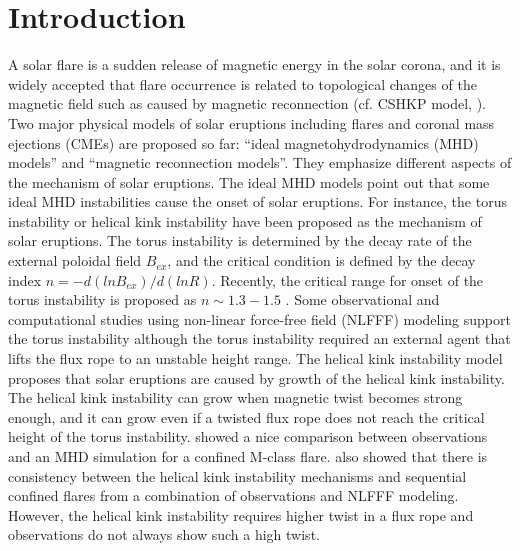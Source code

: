 \documentclass[10pt,preprint2]{aastex}
\begin{document}
\section{Introduction} \label{sec:intro}

A solar flare is a sudden release of magnetic energy in the solar corona, and it is widely accepted that flare occurrence is related to topological changes of the magnetic field such as caused by magnetic reconnection (cf. CSHKP model, \citet{carmichael64, sturrock66, hirayama74, kopppneuman76}).
Two major physical models of solar eruptions including flares and coronal mass ejections (CMEs) are proposed so far: ``ideal magnetohydrodynamics (MHD) models'' and ``magnetic reconnection models''.
They emphasize different aspects of the mechanism of solar eruptions.
The ideal MHD models point out that some ideal MHD instabilities cause the onset of solar eruptions.
For instance, the torus instability \citep[e.g.][]{bateman78, kliemtorok06, demoulin10, kliem14} or helical kink instability \citep[e.g.][]{gerrard01, torok04, fangibson03, torokkliem05} have been proposed as the mechanism of solar eruptions.
The torus instability is determined by the decay rate of the external poloidal field $B_{ex}$, and the critical condition is defined by the decay index ${n = -d({ln} B_{ex})/d({ln} R)}$.
Recently, the critical range for onset of the torus instability is proposed as $n\sim1.3-1.5$ \citep{zuccarello15}. 
Some observational and computational studies using non-linear force-free field (NLFFF) \citep[e.g.][]{cheng11, kliem13, savcheva15} modeling support the torus instability although the torus instability required an external agent that lifts the flux rope to an unstable height range.
The helical kink instability model proposes that solar eruptions are caused by growth of the helical kink instability.
The helical kink instability can grow when magnetic twist becomes strong enough, and it can grow even if a twisted flux rope does not reach the critical height of the torus instability.
\citet{hassanin16} showed a nice comparison between observations and an MHD simulation for a confined M-class flare.
\citet{liu16} also showed that there is consistency between the helical kink instability mechanisms and sequential confined flares from a combination of observations and NLFFF modeling.
However, the helical kink instability requires higher twist in a flux rope and observations do not always show such a high twist.
\end{document}
